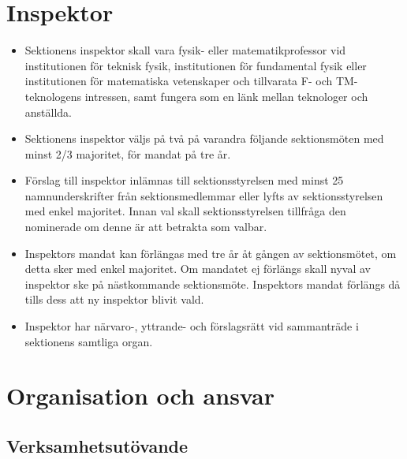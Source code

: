 \documentclass[11pt,a4paper]{article}
\begin{document}
\section{Inspektor}

\begin{itemize}

	\item Sektionens inspektor skall vara fysik- eller matematikprofessor vid institutionen för teknisk fysik, institutionen för fundamental fysik eller institutionen för matematiska vetenskaper och tillvarata F- och TM-teknologens intressen, samt fungera som en länk mellan teknologer och anställda.
	
	\item Sektionens inspektor väljs på två på varandra följande sektionsmöten med minst 2/3 majoritet, för mandat på tre år. 
	
	\item Förslag till inspektor inlämnas till sektionsstyrelsen med minst 25 namnunderskrifter från sektionsmedlemmar eller lyfts av sektionsstyrelsen med enkel majoritet. Innan val skall sektionsstyrelsen tillfråga den nominerade om denne är att betrakta som valbar.
	
	\item Inspektors mandat kan förlängas med tre år åt gången av sektionsmötet, om detta sker med enkel majoritet. Om mandatet ej förlängs skall nyval av inspektor ske på nästkommande sektionsmöte. Inspektors mandat förlängs då tills dess att ny inspektor blivit vald.


\item Inspektor har närvaro-, yttrande- och förslagsrätt vid sammanträde i sektionens samtliga organ.

\end{itemize}


\section{Organisation och ansvar}

\subsection{Verksamhetsutövande}
\end{document}
